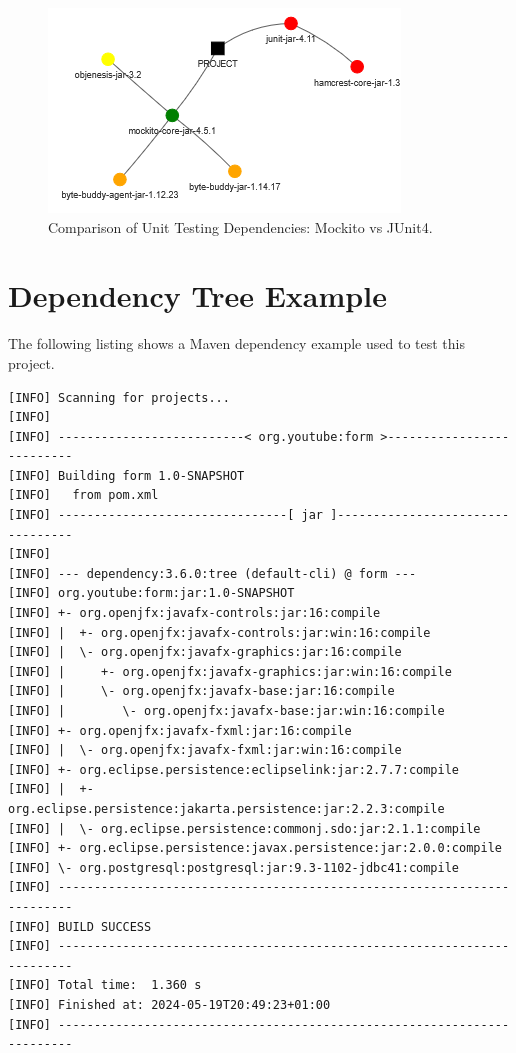 \documentclass[conference]{IEEEtran}
\begin{document}
\begin{figure}[H]
    \centering
    \includegraphics[width=0.5\linewidth]{Comparison.png}
    \caption{Comparison of Unit Testing Dependencies: Mockito vs JUnit4.} 
    \label{fig:comp}
\end{figure}



\section{Dependency Tree Example}
The following listing shows a Maven dependency example used to test this project. 

\begin{lstlisting}[caption=Example Maven dependencies]
[INFO] Scanning for projects...
[INFO] 
[INFO] --------------------------< org.youtube:form >--------------------------
[INFO] Building form 1.0-SNAPSHOT
[INFO]   from pom.xml
[INFO] --------------------------------[ jar ]---------------------------------
[INFO] 
[INFO] --- dependency:3.6.0:tree (default-cli) @ form ---
[INFO] org.youtube:form:jar:1.0-SNAPSHOT
[INFO] +- org.openjfx:javafx-controls:jar:16:compile
[INFO] |  +- org.openjfx:javafx-controls:jar:win:16:compile
[INFO] |  \- org.openjfx:javafx-graphics:jar:16:compile
[INFO] |     +- org.openjfx:javafx-graphics:jar:win:16:compile
[INFO] |     \- org.openjfx:javafx-base:jar:16:compile
[INFO] |        \- org.openjfx:javafx-base:jar:win:16:compile
[INFO] +- org.openjfx:javafx-fxml:jar:16:compile
[INFO] |  \- org.openjfx:javafx-fxml:jar:win:16:compile
[INFO] +- org.eclipse.persistence:eclipselink:jar:2.7.7:compile
[INFO] |  +- org.eclipse.persistence:jakarta.persistence:jar:2.2.3:compile
[INFO] |  \- org.eclipse.persistence:commonj.sdo:jar:2.1.1:compile
[INFO] +- org.eclipse.persistence:javax.persistence:jar:2.0.0:compile
[INFO] \- org.postgresql:postgresql:jar:9.3-1102-jdbc41:compile
[INFO] ------------------------------------------------------------------------
[INFO] BUILD SUCCESS
[INFO] ------------------------------------------------------------------------
[INFO] Total time:  1.360 s
[INFO] Finished at: 2024-05-19T20:49:23+01:00
[INFO] ------------------------------------------------------------------------


\end{lstlisting}


\ifCLASSOPTIONcaptionsoff
  \newpage
\fi
\end{document}
